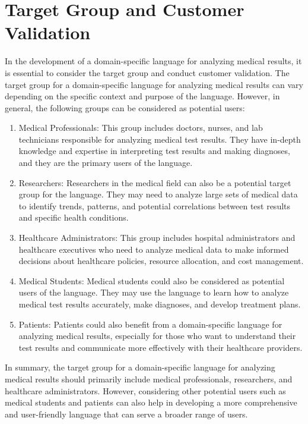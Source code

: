 \section{Target Group and Customer Validation}

In the development of a domain-specific language for analyzing medical results, it is essential to consider the target group and conduct customer validation. The target group for a domain-specific language for analyzing medical results can vary depending on the specific context and purpose of the language. However, in general, the following groups can be considered as potential users:
\begin{enumerate}
\item Medical Professionals: This group includes doctors, nurses, and lab technicians responsible for analyzing medical test results. They have in-depth knowledge and expertise in interpreting test results and making diagnoses, and they are the primary users of the language.

\item Researchers: Researchers in the medical field can also be a potential target group for the language. They may need to analyze large sets of medical data to identify trends, patterns, and potential correlations between test results and specific health conditions.

\item Healthcare Administrators: This group includes hospital administrators and healthcare executives who need to analyze medical data to make informed decisions about healthcare policies, resource allocation, and cost management.

\item Medical Students: Medical students could also be considered as potential users of the language. They may use the language to learn how to analyze medical test results accurately, make diagnoses, and develop treatment plans.

\item Patients: Patients could also benefit from a domain-specific language for analyzing medical results, especially for those who want to understand their test results and communicate more effectively with their healthcare providers.
\end{enumerate}
In summary, the target group for a domain-specific language for analyzing medical results should primarily include medical professionals, researchers, and healthcare administrators. However, considering other potential users such as medical students and patients can also help in developing a more comprehensive and user-friendly language that can serve a broader range of users.

